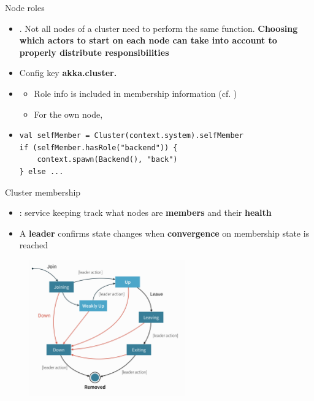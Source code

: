 \documentclass[presentation, 9pt]{beamer}\mode<presentation>{\usetheme{AMSBolognaFC}}
\begin{document}
\begin{frame}[c, fragile]{Node roles}
\begin{itemize}
	\item {}. Not all nodes of a cluster need to perform the same function. \textbf{Choosing
	which actors to start on each node can take  into account to properly distribute
	responsibilities}
	\item Config key \textbf{akka.cluster.}
 	\item {}
  \begin{itemize}
		\item Role info is included in membership information (cf. )
  	\item For the own node, 
   	
	\end{itemize}
	\item[] \begin{tcolorbox}[left=0pt, top=0pt, bottom=0pt, title=Access the \textbf{Cluster} extension on a node]
		\begin{verbatim}
val selfMember = Cluster(context.system).selfMember
if (selfMember.hasRole("backend")) {
	context.spawn(Backend(), "back")
} else ...
		\end{verbatim}
	\end{tcolorbox}
\end{itemize}
\end{frame}
\begin{frame}[c, fragile]{Cluster membership \href{https://doc.akka.io/docs/akka/current/typed/cluster-membership.html}{\faLink}}
	\begin{itemize}
\item {}: service keeping track what nodes are \textbf{members} and their \textbf{health}
\item A \textbf{leader} confirms state changes when \textbf{convergence} on membership state is reached
	\end{itemize}
	\begin{figure}
		\centering
		\includegraphics[width=0.6\textwidth]{img/member-state-diagram.png}
	\end{figure}
\end{frame}
\end{document}
